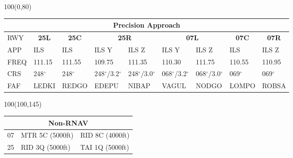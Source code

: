 \documentclass[10pt,landscape,a4paper]{article}
\begin{document}
\begin{textblock}{100}(0,80)
\begin{table}[]
\begin{tabular}{|l|l|l|l|l|l|l|l|l|}
\multicolumn{9}{c}{\textbf{Precision Approach}}                                                                                                                                                                            \\ \hline
RWY  & \multicolumn{1}{c|}{\textbf{25L}} & \multicolumn{1}{c|}{\textbf{25C}} & \multicolumn{2}{c|}{\textbf{25R}} & \multicolumn{2}{c|}{\textbf{07L}} & \multicolumn{1}{c|}{\textbf{07C}} & \multicolumn{1}{c|}{\textbf{07R}} \\ \hline
APP  & ILS                               & ILS                               & ILS Y           & ILS Z           & ILS Y           & ILS Z           & ILS                               & ILS Z                             \\
FREQ & 111.15                            & 111.55                            & 109.75          & 111.35          & 110.30          & 111.75          & 110.55                            & 110.95                            \\
CRS  & 248$^\circ$                              & 248$^\circ$                              & 248$^\circ$/3.2$^\circ$       & 248$^\circ$/3.0$^\circ$       & 068$^\circ$/3.2$^\circ$       & 068$^\circ$/3.0$^\circ$       & 069$^\circ$                              & 069$^\circ$                              \\
FAF  & LEDKI                             & REDGO                             & EDEPU           & NIBAP           & VAGUL           & NODGO           & LOMPO                             & ROBSA                             \\ \hline
\end{tabular}
\end{table}
\end{textblock}



\begin{textblock}{100}(100,145)
\begin{table}[]
\begin{tabular}{|l|l|l|}
\multicolumn{3}{c}{\textbf{Non-RNAV}} \\ \hline
07  & MTR 5C (5000ft)    & RID 8C (4000ft)   \\ \hline
25  & RID 3Q (5000ft)    & TAI 1Q (5000ft)   \\ \hline
\end{tabular}
\end{table}
\end{textblock}
\end{document}
